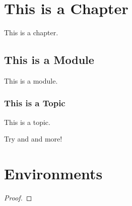 \documentclass[12pt]{notex}
\author{User}
\date{\today}
\begin{document}
\maketitle

\section{This is a Chapter}

This is a chapter.

\subsection{This is a Module}

This is a module.

\subsubsection{This is a Topic}

This is a topic.

Try \NoTeX and \RossTeX and more!

\section{Environments}

\begin{theorem}
    \lipsum[1]
\end{theorem}

\begin{proof}
    \lipsum[2]
\end{proof}

\begin{lemma}
    \lipsum[3]
\end{lemma}

\begin{corollary}
    \lipsum[4]
\end{corollary}

\begin{proposition}
    \lipsum[5]
\end{proposition}

\begin{statement*} %
    \lipsum[6]
\end{statement*}

\begin{conjecture*}
    \lipsum[7]
\end{conjecture*}
\end{document}
